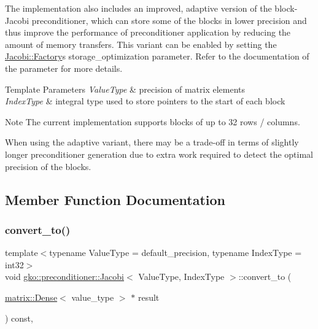 The implementation also includes an improved, adaptive version of the block-\/\+Jacobi preconditioner, which can store some of the blocks in lower precision and thus improve the performance of preconditioner application by reducing the amount of memory transfers. This variant can be enabled by setting the \hyperlink{classgko_1_1preconditioner_1_1Jacobi_1_1Factory}{Jacobi\+::\+Factory}\textquotesingle{}s {\ttfamily storage\+\_\+optimization} parameter. Refer to the documentation of the parameter for more details.


\begin{DoxyTemplParams}{Template Parameters}
{\em Value\+Type} & precision of matrix elements \\
\hline
{\em Index\+Type} & integral type used to store pointers to the start of each block\\
\hline
\end{DoxyTemplParams}
\begin{DoxyNote}{Note}
The current implementation supports blocks of up to 32 rows / columns. 

When using the adaptive variant, there may be a trade-\/off in terms of slightly longer preconditioner generation due to extra work required to detect the optimal precision of the blocks. 
\end{DoxyNote}


\subsection{Member Function Documentation}
\mbox{\label{classgko_1_1preconditioner_1_1Jacobi_a54ce952ac4a12c3f4686442375cd4dc8}} 
\subsubsection{\texorpdfstring{convert\+\_\+to()}{convert\_to()}}
{\footnotesize\ttfamily template$<$typename Value\+Type  = default\+\_\+precision, typename Index\+Type  = int32$>$ \\
void \hyperlink{classgko_1_1preconditioner_1_1Jacobi}{gko\+::preconditioner\+::\+Jacobi}$<$ Value\+Type, Index\+Type $>$\+::convert\+\_\+to (\begin{DoxyParamCaption}\item[{\hyperlink{classgko_1_1matrix_1_1Dense}{matrix\+::\+Dense}$<$ value\+\_\+type $>$ $\ast$}]{result }\end{DoxyParamCaption}) const\hspace{0.3cm}{\ttfamily [override]}, {\ttfamily [virtual]}}



